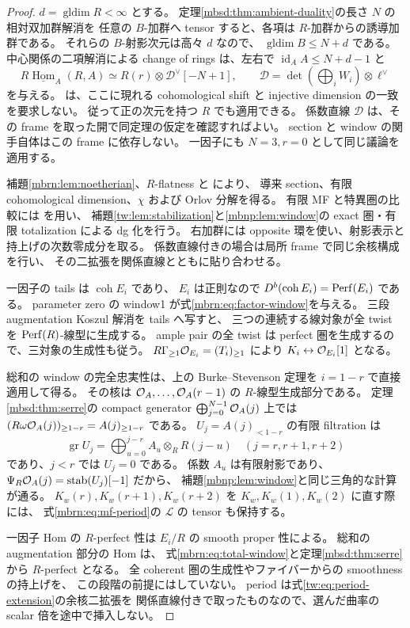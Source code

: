 \begin{proof}
$d=\operatorname{gldim}R<\infty$ とする。
定理\ref{mbsd:thm:ambient-duality}の長さ $N$ の相対双加群解消を
任意の $B$-加群へ tensor すると、各項は $R$-加群からの誘導加群である。
それらの $B$-射影次元は高々 $d$ なので、
$\operatorname{gldim}B\leq N+d$ である。
中心関係の二項解消による change of rings は、左右で
$\operatorname{id}_A A\leq N+d-1$ と
\[
 R\underline{\operatorname{Hom}}_A(R,A)
     \simeq R(r)\otimes\mathscr D^\vee[-N+1],
 \qquad \mathscr D=\det(\bigoplus_iW_i)\otimes\ell^\vee
\]
を与える。
\cite[Definition~5.1, Remark~5.2]{LP-BS}は、ここに現れる cohomological shift と
injective dimension の一致を要求しない。
従って正の次元を持つ $R$ でも適用できる。
係数直線 $\mathscr D$ は、その frame を取った開で同定理の仮定を確認すればよい。
section と window の関手自体はこの frame に依存しない。
一因子にも $N=3,r=0$ として同じ議論を適用する。

補題\ref{mbrn:lem:noetherian}、$R$-flatness と
\cite[Lemmas~6.1--6.2, Proposition~4.18, Theorem~6.4]{LP-BS}により、
導来 section、有限 cohomological dimension、$\chi$ および Orlov 分解を得る。
有限 MF と特異圏の比較には \cite[Theorem~7.2]{AMChen}を用い、
補題\ref{tw:lem:stabilization}と\ref{mbnp:lem:window}の
exact 圏・有限 totalization による dg 化を行う。
右加群には opposite 環を使い、射影表示と持上げの次数零成分を取る。
係数直線付きの場合は局所 frame で同じ余核構成を行い、
その二拡張を関係直線とともに貼り合わせる。

一因子の tails は $\operatorname{coh}E_i$ であり、
$E_i$ は正則なので $D^b(\operatorname{coh}E_i)=\operatorname{Perf}(E_i)$ である。
parameter zero の window1 が式\eqref{mbrn:eq:factor-window}を与える。
三段 augmentation Koszul 解消を tails へ写すと、
三つの連続する線対象が全 twist を $\operatorname{Perf}(R)$-線型に生成する。
ample pair の全 twist は perfect 圏を生成するので、三対象の生成性も従う。
$R\Gamma_{\geq1}\mathcal O_{E_i}=(T_i)_{\geq1}$ により
$K_i\leftrightarrow\mathcal O_{E_i}[1]$ となる。

総和の window の完全忠実性は、上の Burke--Stevenson 定理を
$i=1-r$ で直接適用して得る。
その核は $\mathcal O_A,\ldots,\mathcal O_A(r-1)$ の $R$-線型生成部分である。
定理\ref{mbsd:thm:serre}の compact generator
$\bigoplus_{j=0}^{N-1}\mathcal O_A(j)$ 上では
$(R\omega\mathcal O_A(j))_{\geq1-r}=A(j)_{\geq1-r}$ である。
$U_j=A(j)_{<1-r}$ の有限 filtration は
\[
 \operatorname{gr}U_j=
       \bigoplus_{u=0}^{j-r}A_u\otimes_RR(j-u)
       \quad(j=r,r+1,r+2)
\]
であり、$j<r$ では $U_j=0$ である。
係数 $A_u$ は有限射影であり、
$\Psi_R\mathcal O_A(j)=\operatorname{stab}(U_j)[-1]$ だから、
補題\ref{mbnp:lem:window}と同じ三角的な計算が通る。
$K_w(r),K_w(r+1),K_w(r+2)$ を $K_w,K_w(1),K_w(2)$ に直す際には、
式\eqref{mbrn:eq:mf-period}の $\mathscr L$ の tensor も保持する。

一因子 Hom の $R$-perfect 性は $E_i/R$ の smooth proper 性による。
総和の augmentation 部分の Hom は、
式\eqref{mbrn:eq:total-window}と定理\ref{mbsd:thm:serre}から $R$-perfect となる。
全 coherent 圏の生成性やファイバーからの smoothness の持上げを、
この段階の前提にはしていない。
period は式\eqref{tw:eq:period-extension}の余核二拡張を
関係直線付きで取ったものなので、選んだ曲率の scalar 倍を途中で挿入しない。
\end{proof}

